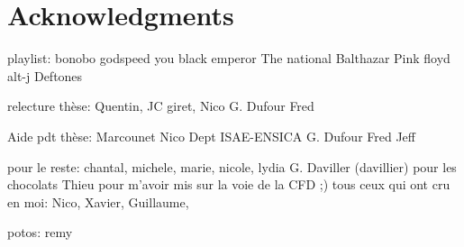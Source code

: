 

\chapter{Acknowledgments}

playlist:
bonobo
godspeed you black emperor
The national
Balthazar
Pink floyd
alt-j
Deftones

relecture thèse:
Quentin,
JC giret,
Nico
G. Dufour
Fred

Aide pdt thèse:
Marcounet
Nico
Dept ISAE-ENSICA
G. Dufour
Fred
Jeff

pour le reste:
chantal, michele, marie, nicole, lydia
G. Daviller (davillier) pour les chocolats
Thieu pour m'avoir mis sur la voie de la CFD ;)
tous ceux qui ont cru en moi: Nico, Xavier, Guillaume, 

potos:
remy